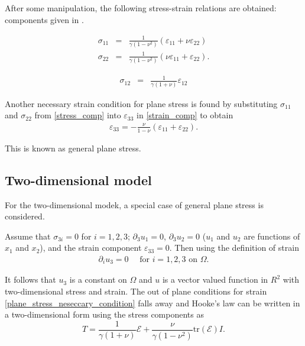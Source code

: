 After some manipulation, the following stress-strain relations are obtained:
components given in \cite{Fung65}.


\begin{minipage}{.5\linewidth}
	\begin{eqnarray*}
		\sigma_{11} & = & \frac{1}{\gamma(1-\nu^2)} ( \varepsilon_{11} + \nu\varepsilon_{22})\\
		\sigma_{22} & = & \frac{1}{\gamma(1-\nu^2)} (\nu \varepsilon_{11} + \varepsilon_{22}).
	\end{eqnarray*}
\end{minipage}%
\begin{minipage}{.5\linewidth}
	\begin{eqnarray}
		\sigma_{12} & = & \frac{1}{\gamma(1+\nu)} \varepsilon_{12} \label{stress_comp}
	\end{eqnarray}
\end{minipage}

Another necessary strain condition for plane stress is found by substituting
$\sigma_{11}$ and $\sigma_{22}$ from \eqref{stress_comp} into
$\varepsilon_{33}$ in \eqref{strain_comp} to obtain
\begin{eqnarray}
	\varepsilon_{33} = -\frac{\nu}{1-\nu} (\varepsilon_{11} + \varepsilon_{22}).\label{plane_stress_neseccary_condition}
\end{eqnarray}

This is known as general plane stress.

\subsection{Two-dimensional model} \label{ssec:2D_Model}
For the two-dimensional modek, a special case of general plane stress is considered.

Assume that $\sigma_{3i} = 0$ for $i = 1, 2, 3$; $\partial_3 u_1 = 0$, $\partial_3 u_2 = 0$ ($u_1$ and $u_2$ are functions of $x_1$ and $x_2$), and the strain component $\varepsilon_{33} = 0$. Then using the definition of strain 
\begin{eqnarray}
	\partial_i u_3 = 0 \quad \textrm{ for } i = 1,2,3 \textrm{ on } \Omega.
\end{eqnarray}

It follows that $u_3$ is a constant on $\Omega$ and $u$ is a vector valued function in 
$R^2$ with two-dimensional stress and strain. The out of plane conditions for strain 
\eqref{plane_stress_neseccary_condition} falls away and Hooke’s law can be written in a 
two-dimensional form using the stress components as 
\[ T = \frac{1}{\gamma(1+\nu)}\mathcal{E} + \frac{\nu}{\gamma(1-\nu^2)}\textrm{tr}(\mathcal{E})I.\]


